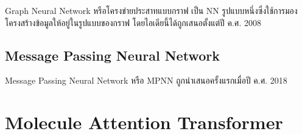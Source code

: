 Graph Neural Network หรือโครงข่ายประสาทแบบกราฟ เป็น NN รูปแบบหนึ่งซึ่งใช้การมองโครงสร้างข้อมูลให้อยู่ในรูปแบบของกราฟ
โดยไอเดียนี้ได้ถูกเสนอตั้งแต่ปี ค.ศ. 2008\cite{scarselli2009,zhou2020}

\subsection{Message Passing Neural Network}

Message Passing Neural Network หรือ MPNN ถูกนำเสนอครั้งแรกเมื่อปี ค.ศ. 2018\cite{gilmer2017}

\section{Molecule Attention Transformer}
